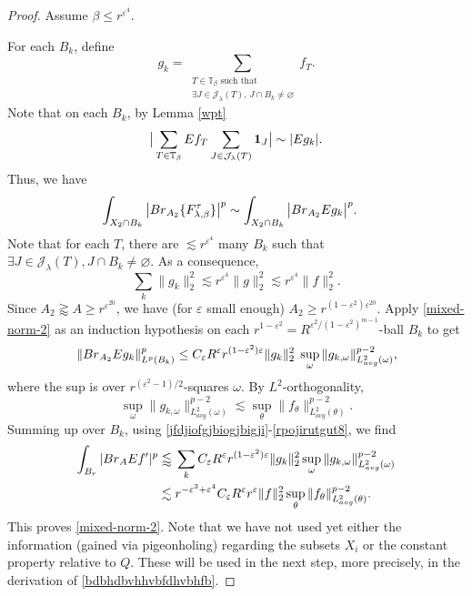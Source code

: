 \documentclass[10pt,a4paper]{amsart}
\newcommand{\Br}{{\rm{Br}}}
\newcommand{\Id}{{\bf{1}}}
\newcommand{\ZT}{\mathbb{T}}
\newcommand{\be}{\beta}
\newcommand{\cj}{\mathcal J}
\newcommand{\e}{\varepsilon}
\newcommand{\la}{\lambda}
\newcommand{\om}{\omega}
\begin{document}
\begin{proof}
	 Assume $\be\leq r^{\e^4}$.
	
	For each $B_k$, define 
	\begin{equation}
		\nonumber
		g_{k}=\sum_{\substack{T\in\ZT_{\be} \text{ such that}\\ \exists J\in\cj_\la(T),\, J\cap B_k\not=\varnothing}} f_{T}.
	\end{equation}
    Note that on each $B_k$, by Lemma \ref{wpt}
    $$\big|\sum_{T\in\ZT_{\be}}Ef_T\sum_{J\in\cj_{\la}(T)}\Id_J\big|\sim |Eg_k|.$$
	Thus, we have
	\begin{align}
		\label{related}
		\int_{X_2\cap B_k}\big|\Br_{A_2}\{F_{\lambda,\beta}^\tau\}\big|^p&\sim\int_{X_2\cap B_k}\big|\Br_{A_2} Eg_k\big|^p.
	\end{align}
	Note that for each $T$, there are $\lesssim r^{\e^{4}}$ many $B_k$ such that $\exists J\in\cj_\la(T), J\cap B_k\not=\varnothing$.
	As a consequence, 
	\begin{equation}
		\label{l2-related}
		\sum_{k}\|g_k\|_2^2\lesssim r^{\e^{4}}\|g\|_2^2\lesssim r^{\e^4}\|f\|_2^2. 
	\end{equation}
	Since $A_2\gtrapprox A\geq r^{\e^{20}}$, we have (for $\e$ small enough) $A_2\geq r^{(1-\e^2)\e^{20}}$.
	Apply \eqref{mixed-norm-2} as an induction hypothesis on each $r^{1-\e^2}=R^{\e^2/(1-\e^2)^{m-1}}$-ball $B_k$ to get
	\begin{equation}
		\label{vpofigtug8utr8gurtg98u}
		\|\Br_{A_2} Eg_k\|_{L^p(B_k)}^p\leq C_\e R^\e r^{(1-\e^2)\e}\|g_k\|_2^2\;\sup_{\om}\|g_{k,\om}\|_{L_{avg}^2(\om)}^{p-2},
	\end{equation}
	where the sup is over  $ r^{(\e^2-1)/2}$-squares $\om$.
	By $L^2$-orthogonality,  
    \begin{equation}
    \label{rpojirutgut8}
    \sup_{\om}\|g_{k,\om}\|_{L^2_{avg}(\om)}^{p-2}\lesssim\sup_{\theta}\|f_{\theta}\|_{L^2_{avg}(\theta)}^{p-2}.
    \end{equation}
	Summing up over $B_k$, using \eqref{jfdjiofgjbiogjbigji}-\eqref{rpojirutgut8},  we find
	\begin{align}
		\nonumber
		\int_{B_r}|\Br_{A} Ef'|^p&\lessapprox \, \sum_{k}C_\e R^\e r^{(1-\e^2)\e} \|g_k\|_2^2\sup_{\om}\|g_{k,\om}\|_{L^2_{avg}(\om)}^{p-2}\\ \nonumber
		&\lesssim  r^{-\e^3+\e^4}C_\e R^\e r^{\e}\|f\|_2^2\sup_{\theta}\|f_{\theta}\|_{L^2_{avg}(\theta)}^{p-2}.
	\end{align}
	This proves \eqref{mixed-norm-2}. Note that  we  have not used yet either the information (gained via pigeonholing) regarding the subsets $X_i$ or the constant property relative to $Q$. These will be used in the next step, more precisely, in the derivation of \eqref{bdbhdbvhhvbfdhvbhfb}.  
	

\end{proof}
\end{document}
